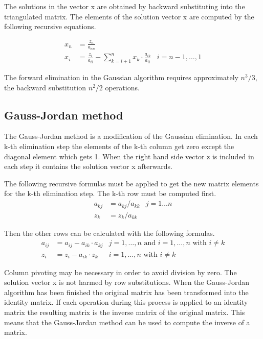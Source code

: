 The solutions in the vector x are obtained by backward substituting
into the triangulated matrix.  The elements of the solution vector x
are computed by the following recursive equations.

\begin{align}
x_{n} &= \frac{z_{n}}{a_{nn}}\\
x_{i} &= \frac{z_{i}}{a_{ii}} - \sum_{k=i+1}^{n} x_{k}\cdot \frac{a_{ik}}{a_{ii}} & i = n - 1,\ldots,1
\end{align}

The forward elimination in the Gaussian algorithm requires
approximately $n^3/3$, the backward substitution $n^2/2$ operations.

\subsection{Gauss-Jordan method}

The Gauss-Jordan method is a modification of the Gaussian elimination.
In each k-th elimination step the elements of the k-th column get zero
except the diagonal element which gets 1.  When the right hand side
vector z is included in each step it contains the solution vector x
afterwards.

\addvspace{12pt}

The following recursive formulas must be applied to get the new matrix
elements for the k-th elimination step.  The k-th row must be computed
first.
\begin{align}
a_{kj} &= a_{kj} / a_{kk} & j = 1\ldots n\\
z_{k}  &= z_{k} / a_{kk}  &
\end{align}

Then the other rows can be calculated with the following formulas.
\begin{align}
a_{ij} &= a_{ij} - a_{ik}\cdot a_{kj} & j = 1,\ldots,n \textrm{ and } i = 1,\ldots,n \textrm{ with } i \ne k\\
z_{i}  &= z_{i} - a_{ik}\cdot z_{k}   & i = 1,\ldots,n \textrm{ with } i \ne k
\end{align}

Column pivoting may be necessary in order to avoid division by zero.
The solution vector x is not harmed by row substitutions.  When the
Gauss-Jordan algorithm has been finished the original matrix has been
transformed into the identity matrix.  If each operation during this
process is applied to an identity matrix the resulting matrix is the
inverse matrix of the original matrix.  This means that the
Gauss-Jordan method can be used to compute the inverse of a matrix.

